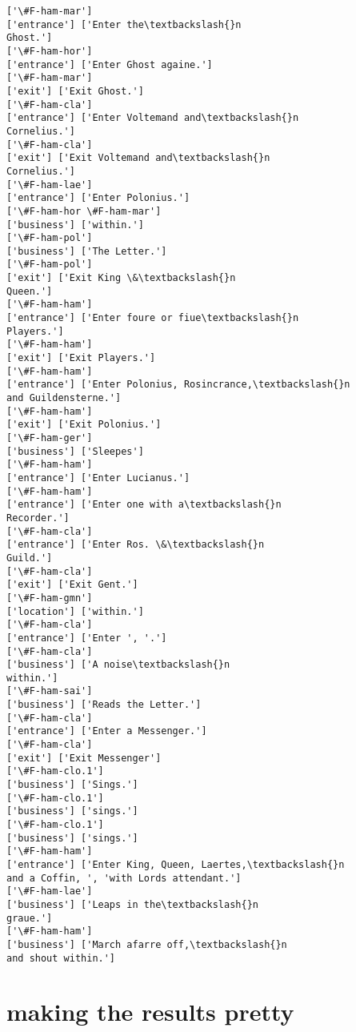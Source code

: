 \documentclass[11pt]{article}
\begin{document}
    \begin{Verbatim}[commandchars=\\\{\}]
['\#F-ham-mar']
['entrance'] ['Enter the\textbackslash{}n                                Ghost.']
['\#F-ham-hor']
['entrance'] ['Enter Ghost againe.']
['\#F-ham-mar']
['exit'] ['Exit Ghost.']
['\#F-ham-cla']
['entrance'] ['Enter Voltemand and\textbackslash{}n                                Cornelius.']
['\#F-ham-cla']
['exit'] ['Exit Voltemand and\textbackslash{}n                                Cornelius.']
['\#F-ham-lae']
['entrance'] ['Enter Polonius.']
['\#F-ham-hor \#F-ham-mar']
['business'] ['within.']
['\#F-ham-pol']
['business'] ['The Letter.']
['\#F-ham-pol']
['exit'] ['Exit King \&\textbackslash{}n                                Queen.']
['\#F-ham-ham']
['entrance'] ['Enter foure or fiue\textbackslash{}n                                Players.']
['\#F-ham-ham']
['exit'] ['Exit Players.']
['\#F-ham-ham']
['entrance'] ['Enter Polonius, Rosincrance,\textbackslash{}n                                and Guildensterne.']
['\#F-ham-ham']
['exit'] ['Exit Polonius.']
['\#F-ham-ger']
['business'] ['Sleepes']
['\#F-ham-ham']
['entrance'] ['Enter Lucianus.']
['\#F-ham-ham']
['entrance'] ['Enter one with a\textbackslash{}n                                Recorder.']
['\#F-ham-cla']
['entrance'] ['Enter Ros. \&\textbackslash{}n                                Guild.']
['\#F-ham-cla']
['exit'] ['Exit Gent.']
['\#F-ham-gmn']
['location'] ['within.']
['\#F-ham-cla']
['entrance'] ['Enter ', '.']
['\#F-ham-cla']
['business'] ['A noise\textbackslash{}n                                within.']
['\#F-ham-sai']
['business'] ['Reads the Letter.']
['\#F-ham-cla']
['entrance'] ['Enter a Messenger.']
['\#F-ham-cla']
['exit'] ['Exit Messenger']
['\#F-ham-clo.1']
['business'] ['Sings.']
['\#F-ham-clo.1']
['business'] ['sings.']
['\#F-ham-clo.1']
['business'] ['sings.']
['\#F-ham-ham']
['entrance'] ['Enter King, Queen, Laertes,\textbackslash{}n                                and a Coffin, ', 'with Lords attendant.']
['\#F-ham-lae']
['business'] ['Leaps in the\textbackslash{}n                                graue.']
['\#F-ham-ham']
['business'] ['March afarre off,\textbackslash{}n                                and shout within.']

    \end{Verbatim}

    \section{making the results pretty}\label{making-the-results-pretty}
\end{document}
